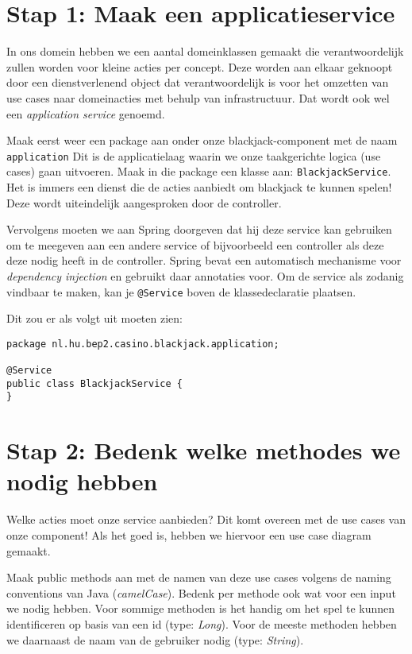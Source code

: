 \section{Stap 1: Maak een applicatieservice}
In ons domein hebben we een aantal domeinklassen gemaakt die verantwoordelijk 
zullen worden voor kleine acties per concept. Deze worden aan elkaar geknoopt 
door een dienstverlenend object dat verantwoordelijk is voor het omzetten van 
use cases naar domeinacties met behulp van infrastructuur. 
Dat wordt ook wel een \textit{application service} genoemd.

Maak eerst weer een package aan onder onze blackjack-component met de naam \texttt{application}
Dit is de applicatielaag waarin we onze taakgerichte logica (use cases) gaan uitvoeren.
Maak in die package een klasse aan: \texttt{BlackjackService}.
Het is immers een dienst die de acties aanbiedt om blackjack te kunnen spelen!
Deze wordt uiteindelijk aangesproken door de controller.

Vervolgens moeten we aan Spring doorgeven dat hij deze service kan gebruiken 
om te meegeven aan een andere service of bijvoorbeeld een controller als deze 
deze nodig heeft in de controller. Spring bevat een automatisch mechanisme 
voor \textit{dependency injection} en gebruikt daar annotaties voor. Om de service 
als zodanig vindbaar te maken, kan je \texttt{@Service} boven de klassedeclaratie plaatsen.

Dit zou er als volgt uit moeten zien:
\begin{verbatim}
package nl.hu.bep2.casino.blackjack.application;

@Service
public class BlackjackService {
}
\end{verbatim}

\section{Stap 2: Bedenk welke methodes we nodig hebben}
Welke acties moet onze service aanbieden? 
Dit komt overeen met de use cases van onze component! 
Als het goed is, hebben we hiervoor een use case diagram gemaakt.

Maak public methods aan met de namen van deze use cases volgens 
de naming conventions van Java (\textit{camelCase}). 
Bedenk per methode ook wat voor een input we nodig hebben.
Voor sommige methoden is het handig om het spel te kunnen identificeren
op basis van een id (type: \textit{Long}). Voor de meeste methoden hebben 
we daarnaast de naam van de gebruiker nodig (type: \textit{String}).


